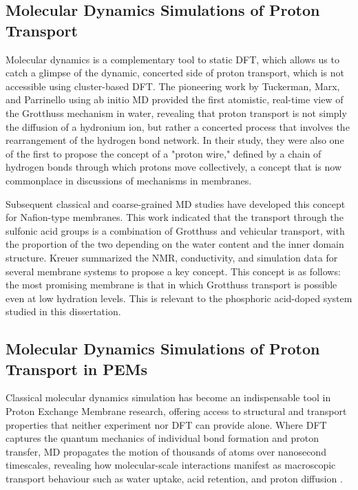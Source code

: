 \documentclass[12pt,a4paper]{report}
\begin{document}
\subsection{Molecular Dynamics Simulations of Proton Transport}
Molecular dynamics is a complementary tool to static DFT, which allows us to catch a glimpse of the dynamic, concerted side of proton transport, which is not accessible using cluster-based DFT. The pioneering work by Tuckerman, Marx, and Parrinello using ab initio MD provided the first atomistic, real-time view of the Grotthuss mechanism in water, revealing that proton transport is not simply the diffusion of a hydronium ion, but rather a concerted process that involves the rearrangement of the hydrogen bond network.\cite{61,62} In their study, they were also one of the first to propose the concept of a "proton wire," defined by a chain of hydrogen bonds through which protons move collectively, a concept that is now commonplace in discussions of mechanisms in membranes.

Subsequent classical and coarse-grained MD studies have developed this concept for Nafion-type membranes. This work indicated that the transport through the sulfonic acid groups is a combination of Grotthuss and vehicular transport, with the proportion of the two depending on the water content and the inner domain structure.\cite{63} Kreuer summarized the NMR, conductivity, and simulation data for several membrane systems to propose a key concept. This concept is as follows: the most promising membrane is that in which Grotthuss transport is possible even at low hydration levels. This is relevant to the phosphoric acid-doped system studied in this dissertation.\cite{64}


\subsection{Molecular Dynamics Simulations of Proton Transport in PEMs}

Classical molecular dynamics simulation has become an indispensable 
tool in Proton Exchange Membrane research, offering access to structural 
and transport properties that neither experiment nor DFT can provide 
alone. Where DFT captures the quantum mechanics of individual bond 
formation and proton transfer, MD propagates the motion of thousands 
of atoms over nanosecond timescales, revealing how molecular-scale 
interactions manifest as macroscopic transport behaviour such as water 
uptake, acid retention, and proton diffusion \cite{64}.
\end{document}
